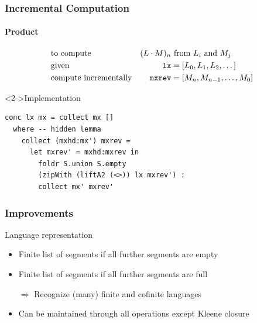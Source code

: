 \documentclass[pdftex,aspectratio=169]{beamer}
\begin{document}
\begin{frame}[fragile]
  \frametitle{Incremental Computation}
  \framesubtitle{Product}
  \vspace{-2.5\baselineskip}
  \begin{align*}
    & \text{to compute} & (L \cdot M)_n&\text{ from }L_i\text{ and }M_j \\
    & \text{given} & \code{lx} &= [L_0, L_1, L_2, \dots ]\\
     & \text{compute incrementally} &
    \code{mxrev} &= [M_n, M_{n-1}, \dots , M_0]
  \end{align*}
  \begin{block}<2->{Implementation}
\begin{lstlisting}[numbers=none]
conc lx mx = collect mx []
  where -- hidden lemma
    collect (mxhd:mx') mxrev =
      let mxrev' = mxhd:mxrev in
        foldr S.union S.empty 
        (zipWith (liftA2 (<>)) lx mxrev') :
        collect mx' mxrev'
\end{lstlisting}
  \end{block}
\end{frame}
\begin{frame}
  \frametitle{Improvements}
  \begin{block}{Language representation}
  \begin{itemize}
  \item Finite list of segments if all further segments are empty
  \item Finite list of segments if all further segments are full
  \item[$\Rightarrow$] Recognize (many) finite and cofinite languages
  \item Can be maintained through all operations except Kleene closure
  \end{itemize}
\end{block}
\end{frame}
\end{document}
